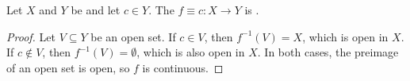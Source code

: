 \begin{proposition} \label{proposition:constant_function_between_topological_spaces_is_continuous}
    Let $X$ and $Y$ be  and let $c \in Y$. The  $f \equiv c : X \to Y$ is .
\end{proposition}
\begin{proof}
    Let $V \subseteq Y$ be an open set. If $c \in V$, then $f^{-1}(V) = X$, which is open in $X$. If $c \notin V$, then $f^{-1}(V) = \emptyset$, which is also open in $X$. In both cases, the preimage of an open set is open, so $f$ is continuous.
\end{proof}